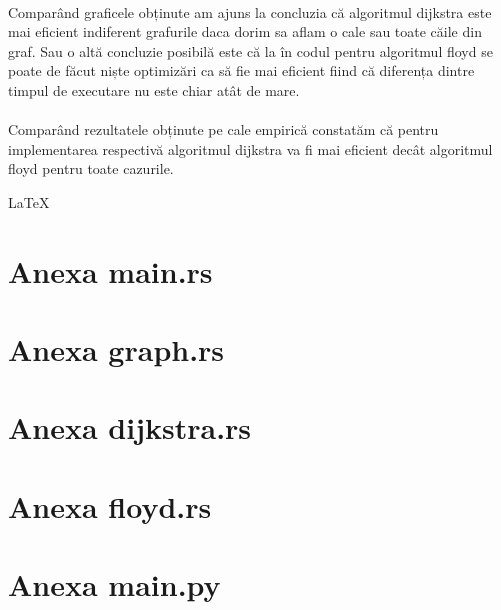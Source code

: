 \documentclass[14pt,a4paper]{extreport}
\begin{document}
\paragraph{}
Comparând graficele obținute am ajuns la concluzia că algoritmul dijkstra este mai eficient indiferent grafurile daca dorim sa aflam o cale sau toate căile din graf. Sau o altă concluzie posibilă este că la în codul pentru algoritmul floyd se poate de făcut niște optimizări ca să fie mai eficient fiind că diferența dintre timpul de executare nu este chiar atât de mare.
\paragraph{}
Comparând rezultatele obținute pe cale empirică constatăm că pentru implementarea respectivă algoritmul dijkstra va fi mai eficient decât algoritmul floyd pentru toate cazurile.

\vfill
\begin{flushright}
\LaTeX
\end{flushright}


\appendix
\clearpage
\section*{Anexa main.rs}


\clearpage
\section*{Anexa graph.rs}


\clearpage
\section*{Anexa dijkstra.rs}


\clearpage
\section*{Anexa floyd.rs}


\clearpage
\section*{Anexa main.py}

\end{document}
